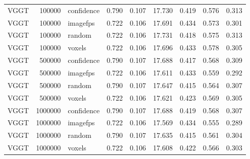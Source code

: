 \begin{table}[H]
\begin{tabular}{lrlrrrrrr}
VGGT & 100000 & confidence & 0.790 & 0.107 & 17.730 & 0.419 & 0.576 & 0.313 \\
VGGT & 100000 & imagefps & 0.722 & 0.106 & 17.691 & 0.434 & 0.573 & 0.301 \\
VGGT & 100000 & random & 0.722 & 0.106 & 17.731 & 0.418 & 0.575 & 0.313 \\
VGGT & 100000 & voxels & 0.722 & 0.106 & 17.696 & 0.433 & 0.578 & 0.305 \\
VGGT & 500000 & confidence & 0.790 & 0.107 & 17.688 & 0.417 & 0.568 & 0.309 \\
VGGT & 500000 & imagefps & 0.722 & 0.106 & 17.611 & 0.433 & 0.559 & 0.292 \\
VGGT & 500000 & random & 0.790 & 0.107 & 17.647 & 0.415 & 0.564 & 0.307 \\
VGGT & 500000 & voxels & 0.722 & 0.106 & 17.621 & 0.423 & 0.569 & 0.305 \\
VGGT & 1000000 & confidence & 0.790 & 0.107 & 17.688 & 0.419 & 0.568 & 0.307 \\
VGGT & 1000000 & imagefps & 0.722 & 0.106 & 17.569 & 0.434 & 0.555 & 0.289 \\
VGGT & 1000000 & random & 0.790 & 0.107 & 17.635 & 0.415 & 0.561 & 0.304 \\
VGGT & 1000000 & voxels & 0.722 & 0.106 & 17.608 & 0.422 & 0.566 & 0.303 \\
\bottomrule
\end{tabular}
\end{table}